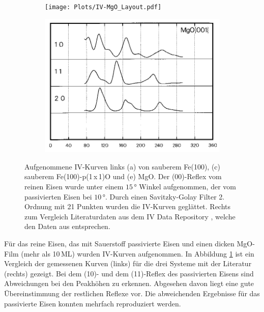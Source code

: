 \begin{figure}[H]
\begin{subfigure}{0.47\textwidth}
    \caption{}
  \end{subfigure}
  \begin{subfigure}{0.47\textwidth}
    \texttt{[image: Plots/IV-MgO\_Layout.pdf]}
    \caption{}
  \end{subfigure}
  \begin{subfigure}{0.47\textwidth}
    \vspace{0.6cm}
    \includegraphics[width=\textwidth]{Plots/mgo.png}
    \caption{}
  \end{subfigure}
  \caption{Aufgenommene IV-Kurven links (a) von sauberem Fe(100), (c) sauberem Fe(100)-p(1\,x\,1)O und (e) MgO. 
          Der (00)-Reflex vom reinen Eisen wurde unter einem $15\,\si{\degree}$ Winkel aufgenommen, der vom passivierten Eisen bei $10\,\si{\degree}$.
          Durch einen Savitzky-Golay Filter 2. Ordnung mit 21 Punkten wurden die
          IV-Kurven geglättet.
          Rechts zum Vergleich Literaturdaten aus dem IV Data Repository \cite{IV}, welche den Daten aus \cite{PhysRevB.16.5271,Legg_1977,JONA1987667,URANO1983109} entsprechen.}%
  \label{fig:IV1}
\end{figure}


Für das reine Eisen, das mit Sauerstoff passivierte Eisen und einen dicken MgO-Film (mehr als 10\,ML)
wurden IV-Kurven aufgenommen. In Abbildung \ref{fig:IV1} ist ein Vergleich der gemessenen Kurven (links) für die 
drei Systeme mit der Literatur (rechts) gezeigt.
Bei dem (10)- und dem (11)-Reflex des passivierten Eisens sind Abweichungen bei den Peakhöhen zu erkennen.
Abgesehen davon liegt eine gute Übereinstimmung der restlichen Reflexe vor.
Die abweichenden Ergebnisse für das passivierte Eisen konnten mehrfach reproduziert werden.


